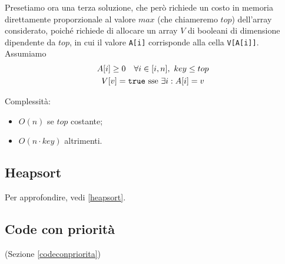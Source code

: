 Presetiamo ora una terza soluzione, che però richiede un costo in memoria direttamente proporzionale al valore $max$ (che chiameremo $top$)
dell'array considerato, poiché richiede di allocare un array $V$ di booleani di dimensione dipendente da $top$, in cui il valore \texttt{A[i]} corrisponde alla cella \texttt{V[A[i]]}. Assumiamo
\begin{gather*}
	A[i] \geq 0 \quad \forall i \in [i,n], \ key \leq top \\
	V[v] = \text{\texttt{true} sse } \exists i : A[i] = v 
\end{gather*}


Complessità:
\begin{itemize}
	\item $O(n)$ se $top$ costante;
	\item $O(n \cdot key)$ altrimenti.
\end{itemize}
\newpage
\subsection{Heapsort}
Per approfondire, vedi \ref{heapsort}. 







\subsection{Code con priorità}
(Sezione \ref{codeconpriorita})







